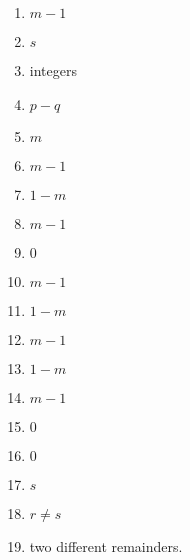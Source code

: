 \begin{multicols}{4}
\begin{enumerate}
\item
\noindent
$m-1$
\item
$s$
\item
integers
\item
$p-q$
\item
$m$
\item
$m-1$
\item
$1-m$
\item
$m-1$
\item
$0$
\item
$m-1$
\item
$1-m$
\item
$m-1$
\item
$1-m$
\item
$m-1$
\item
$0$
\item
$0$
\item
$s$
\item
$r \neq s$
\item
two different remainders.
\end{enumerate}
\end{multicols}

